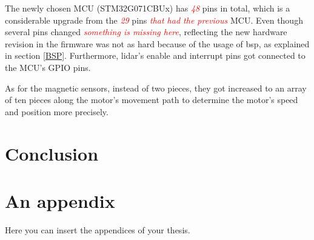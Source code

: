 \documentclass[
  digital,     %
  oneside,     %
  nosansbold,  %
  nocolorbold, %
  lof,         %
  lot,         %
]{fithesis4}
\newcommand{\TODO}[1]{\textcolor{red}{\textit{#1}}}
\begin{document}
The newly chosen MCU (STM32G071CBUx) has \TODO{48} pins in total, which is a considerable upgrade from the \TODO{29} pins \TODO{that had the previous} MCU. Even though several pins changed \TODO{something is missing here}, reflecting the new hardware revision in the firmware was not as hard because of the usage of \acrshort{bsp}, as explained in section \ref{BSP}. Furthermore, \acrshort{lidar}'s enable and interrupt pins got connected to the MCU's GPIO pins.

As for the magnetic sensors, instead of two pieces, they got increased to an array of ten pieces along the motor's movement path to determine the motor's speed and position more precisely.

\chapter{Conclusion}


\appendix %
\chapter{An appendix}
Here you can insert the appendices of your thesis.
\end{document}
